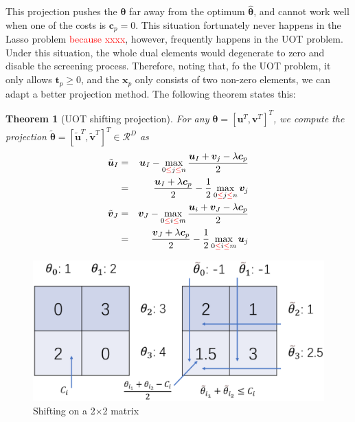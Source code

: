 \documentclass[twoside]{article}
\theoremstyle{plain}
\newtheorem{thm}{Theorem}
\newcommand{\tranT}{T}
\renewcommand{\vec}[1]{\bm{#1}}
\newcommand{\changeHK}[1]{\textcolor{red}{#1}}
\begin{document}
This projection pushes the $\vec{\theta}$ far away from the optimum $\hat{\vec{\theta}}$, and cannot work well when one of the costs is $\vec{c}_p = 0$. This situation fortunately never happens in the Lasso problem \changeHK{because xxxx}, however, frequently happens in the UOT problem. Under this situation, the whole dual elements would degenerate to zero and disable the screening process. Therefore, noting that, fo the UOT problem, it only allows $\vec{t}_p \geq 0$, and the $\vec{x}_p$ only consists of two non-zero elements, we can adapt a better projection method. The following theorem states this:
\begin{thm}[UOT shifting projection]
\label{Thm:UOT_ShiftProjection}
For any $\vec{\theta} = [{\vec{u}}^{\tranT},{\vec{v}}^{\tranT}]^{\tranT}$, we compute the projection $\tilde{\vec{\theta}} = [\tilde{\vec{u}}^{\tranT},\tilde{\vec{v}}^{\tranT}]^{\tranT} \in \mathcal{R}^{D}$ as
\begin{eqnarray}
\tilde{\vec{u}}_I &=& {\vec{u}}_I - \max_{0\changeHK{\leq} j\changeHK{\leq} n} \frac{{\vec{u}}_I +{\vec{v}}_j - \lambda\vec{c}_{p}}{2} \notag\\
& =& \frac{{\vec{u}}_I +\lambda\vec{c}_{p}}{2} - \frac{1}{2}\max_{0\changeHK{\leq} j\changeHK{\leq} n} {\vec{v}}_j\\
\tilde{\vec{v}}_J &=& {\vec{v}}_J - \max_{0 \changeHK{\leq} i \changeHK{\leq} m} \frac{{\vec{u}}_i +{\vec{v}}_J - \lambda\vec{c}_{p}}{2}\notag\\
& =& \frac{{\vec{v}}_J +\lambda\vec{c}_{p}}{2} - \frac{1}{2}\max_{0\changeHK{\leq} i\changeHK{\leq} m} {\vec{u}}_j
 \label{eq:uotproj}
\end{eqnarray}
\end{thm}
	\begin{figure}[h]
	\begin{center}	
	\includegraphics[width = \linewidth]{pic/shifting}
	\caption{Shifting on a 2$\times$2 matrix}
	\end{center}	
	\end{figure}
\end{document}
